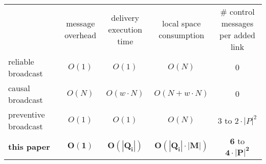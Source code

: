 \newcommand{\cmark}{\ding{51}}%
\newcommand{\xmark}{\ding{55}}%


\small

\begin{tabularx}{1.7\columnwidth}{@{}Xcccc@{}}
  & \makecell{message\\overhead} &  \makecell{delivery\\execution time} & \makecell{local space\\consumption} & \makecell{\# control messages\\per added link} \\ \cmidrule{2-5}
  reliable broadcast~\cite{hadzilacos1994modular} & $O(1)$ & $O(1)$ & $O(N)$ & $0$ \\
  causal broadcast~\cite{schwarz1994detecting} & $O(N)$ & $O(w \cdot N)$ & $O(N+w\cdot N)$ & $0$ \\ 
  preventive broadcast~\cite{nedelec2018pcbroadcast} & $O(1)$ & $O(1)$ & $O(N)$ & $3$ to $2\cdot |P|^2$ \\ \hline\hline
  \textbf{this paper} & $\mathbf{O(1)}$ & $\mathbf{O(|Q_i|)}$ & $\mathbf{O(|Q_i| \cdot |M|)}$ & $\mathbf{6}$ to $\mathbf{4\cdot|P|^2}$ \\
\end{tabularx}

